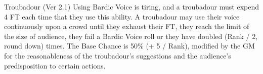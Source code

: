 \begin{Chapter}{Troubadour (Ver 2.1)}
Using Bardic Voice is tiring, and a troubadour must expend 4 FT each
time that they use this ability.  A troubadour may use their voice
continuously upon a crowd until they exhaust their FT, they reach
the limit of the size of audience, they fail a Bardic Voice roll or
they have doubled (Rank / 2, round down) times.  The Base Chance is
50\% (+ 5 / Rank), modified by the GM for the reasonableness of the
troubadour’s suggestions and the audience’s predisposition to certain
actions.

\end{Chapter}
